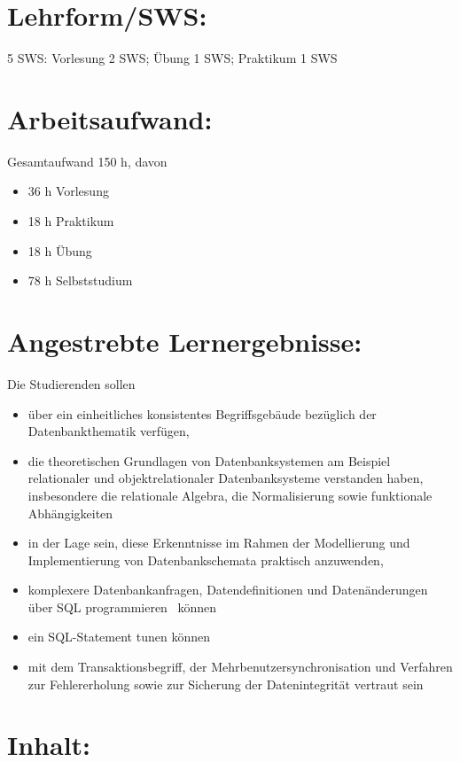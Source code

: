\section*{Lehrform/SWS:}\label{lehrformsws-7}

5 SWS: Vorlesung 2 SWS; Übung 1 SWS; Praktikum 1 SWS

\section*{Arbeitsaufwand:}\label{arbeitsaufwand-7}

Gesamtaufwand 150 h, davon

\begin{itemize}
\item
  36 h Vorlesung
\item
  18 h Praktikum
\item
  18 h Übung
\item
  78 h Selbststudium
\end{itemize}

\section*{Angestrebte
Lernergebnisse:}\label{angestrebte-lernergebnisse-7}

Die Studierenden sollen

\begin{itemize}
\item
  über ein einheitliches konsistentes Begriffsgebäude bezüglich der
  Datenbankthematik verfügen,
\item
  die theoretischen Grundlagen von Datenbanksystemen am Beispiel
  relationaler und objektrelationaler Datenbanksysteme verstanden haben,
  insbesondere die relationale Algebra, die Normalisierung sowie
  funktionale Abhängigkeiten
\item
  in der Lage sein, diese Erkenntnisse im Rahmen der Modellierung und
  Implementierung von Datenbankschemata praktisch anzuwenden,
\item
  komplexere Datenbankanfragen, Datendefinitionen und Datenänderungen
  über SQL programmieren~ können
\item
  ein SQL-Statement tunen können
\item
  mit dem Transaktionsbegriff, der Mehrbenutzersynchronisation und
  Verfahren zur Fehlererholung sowie zur Sicherung der Datenintegrität
  vertraut sein
\end{itemize}

\section*{Inhalt:}\label{inhalt-7}

